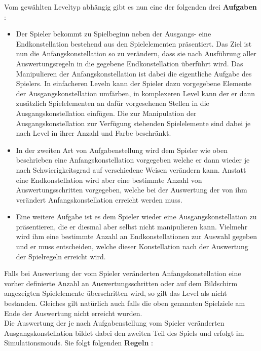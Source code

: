 Vom gewählten Leveltyp abhängig gibt es nun eine der folgenden drei \textbf{Aufgaben} :


	\begin{itemize}
		\item Der Spieler bekommt zu Spielbeginn neben der Ausgangs- eine Endkonstellation bestehend aus den Spielelementen präsentiert.
		Das Ziel ist nun die Anfangskonstellation so zu verändern, dass sie nach Ausführung aller Auswertungsregeln in die gegebene Endkonstellation überführt wird.
		Das Manipulieren der Anfangskonstellation ist dabei die eigentliche Aufgabe des Spielers.
		In einfacheren Leveln kann der Spieler dazu vorgegebene Elemente der Ausgangskonstellation umfärben, in komplexeren Level kann der er dann zusätzlich Spielelementen an dafür vorgesehenen Stellen in die Ausgangskonstellation einfügen. Die zur Manipulation der Ausgangskonstellation zur Verfügung stehenden Spielelemente sind dabei je nach Level in ihrer Anzahl und Farbe beschränkt.

		\item In der zweiten Art von Aufgabenstellung wird dem Spieler wie oben beschrieben eine Anfangskonstellation vorgegeben welche er dann wieder je nach Schwierigkeitsgrad auf verschiedene Weisen verändern kann. Anstatt eine Endkonstellation wird aber eine bestimmte Anzahl von Auswertungsschritten vorgegeben, welche bei der Auswertung der von ihm verändert Anfangskonstellation erreicht werden muss.

		\item Eine weitere Aufgabe ist es dem Spieler wieder eine Ausgangskonstellation zu präsentieren, die er diesmal aber selbst nicht manipulieren kann. Vielmehr wird ihm eine bestimmte Anzahl an Endkonstellationen zur Auswahl gegeben und er muss entscheiden, welche dieser Konstellation nach der Auswertung der Spielregeln erreicht wird.

	\end{itemize}

	Falls bei Auswertung der vom Spieler veränderten Anfangskonstellation eine vorher definierte Anzahl an Auswertungsschritten oder auf dem Bildschirm angezeigten Spielelemente überschritten wird, so gilt das Level als nicht bestanden. Gleiches gilt natürlich auch falls die oben genannten Spielziele am Ende der Auswertung nicht erreicht wurden. \\
	
Die Auswertung der je nach Aufgabenstellung vom Spieler veränderten Ausgangskonstellation bildet dabei den zweiten Teil des Spiels und erfolgt im Simulationsmouds. Sie folgt folgenden \textbf{Regeln} :

